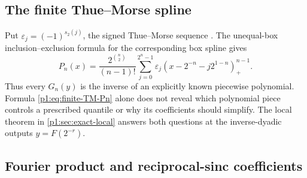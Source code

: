 \documentclass[11pt,oneside]{article}
\numberwithin{equation}{section}
\theoremstyle{definition}
\theoremstyle{remark}
\newcommand{\TM}{\varepsilon}
\newcommand{\Fn}{P_n}
\newcommand{\Gn}{G_n}
\newcommand{\pospart}[1]{\left(#1\right)_{+}}
\begin{document}
\subsection{The finite Thue--Morse spline}

Put $\TM_j=(-1)^{s_2(j)}$, the signed Thue--Morse sequence \cite{p1:AlloucheShallit}.  The unequal-box inclusion--exclusion formula for the corresponding box spline \cite{p1:deBoorSplines} gives
\begin{equation}
 \boxed{
 \Fn(x)=\frac{2^{\binom n2}}{(n-1)!}
 \sum_{j=0}^{2^n-1}\TM_j
 \pospart{x-2^{-n}-j2^{1-n}}^{n-1}.}
 \label{p1:eq:finite-TM-Pn}
\end{equation}
Thus every $\Gn(y)$ is the inverse of an explicitly known piecewise polynomial.  Formula
\eqref{p1:eq:finite-TM-Pn} alone does not reveal which polynomial piece controls a prescribed
quantile or why its coefficients should simplify.  The local theorem in \cref{p1:sec:exact-local}
answers both questions at the inverse-dyadic outputs $y=F(2^{-r})$.

\subsection{Fourier product and reciprocal-sinc coefficients}
\end{document}
